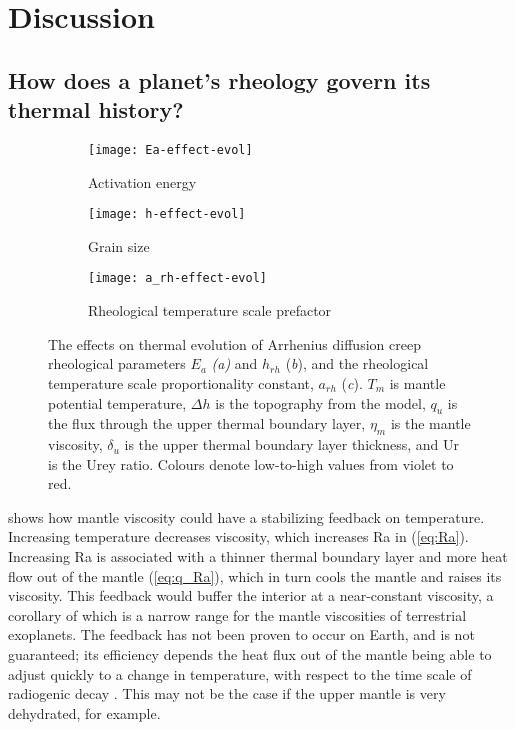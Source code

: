 \section{Discussion}

\subsection{How does a planet's rheology govern its thermal history?}\label{sec:dis-rheology}

\begin{figure}
\centering
\begin{subfigure}{.5\textwidth}
  \centering
  \texttt{[image: Ea-effect-evol]}
  \caption{Activation energy}
  \label{fig:Ea}
\end{subfigure}%
\begin{subfigure}{.5\textwidth}
  \centering
  \texttt{[image: h-effect-evol]}
  \caption{Grain size}
  \label{fig:h_rh} 
\end{subfigure} 

\begin{subfigure}{.5\textwidth}
  \centering
  \texttt{[image: a\_rh-effect-evol]}
  \caption{Rheological temperature scale prefactor}
  \label{fig:a_rh} 
\end{subfigure}
\caption{The effects on thermal evolution of Arrhenius diffusion creep rheological parameters $E_a$ \textit{(a)} and $h_{rh}$ (\textit{b}), and the rheological temperature scale proportionality constant, $a_{rh}$ (\textit{c}). $T_m$ is mantle potential temperature, $\Delta h$ is the topography from the \citet{Parsons1983} model, $q_{u}$ is the flux through the upper thermal boundary layer, $\eta_m$ is the mantle viscosity, $\delta_{u}$ is the upper thermal boundary layer thickness, and Ur is the Urey ratio. Colours denote low-to-high values from violet to red.}
\label{fig:rheology}
\end{figure}


\citet{Urey1955} shows how mantle viscosity could have a stabilizing feedback on temperature. Increasing temperature decreases viscosity, which increases Ra in (\ref{eq:Ra}). Increasing Ra is associated with a thinner thermal boundary layer and more heat flow out of the mantle (\ref{eq:q_Ra}), which in turn cools the mantle and raises its viscosity. This feedback would buffer the interior at a near-constant viscosity, a corollary of which is a narrow range for the mantle viscosities of terrestrial exoplanets. The feedback has not been proven to occur on Earth, and is not guaranteed; its efficiency depends the heat flux out of the mantle being able to adjust quickly to a change in temperature, with respect to the time scale of radiogenic decay \citep{Korenaga2008a}. This may not be the case if the upper mantle is very dehydrated, for example.



